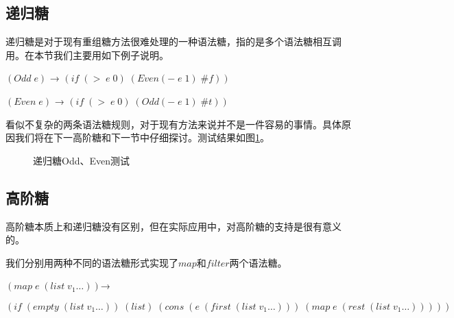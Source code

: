 \subsection{递归糖}

递归糖是对于现有重组糖方法很难处理的一种语法糖，指的是多个语法糖相互调用。在本节我们主要用如下例子说明。

$(Odd\;e)$ → $(if\;(>\;e\;0)\;(Even (-\;e\;1)\;\#f))$

$(Even\;e)$ → $(if\;(>\;e\;0)\;(Odd (-\;e\;1)\;\#t))$

看似不复杂的两条语法糖规则，对于现有方法来说并不是一件容易的事情。具体原因我们将在下一高阶糖和下一节中仔细探讨。测试结果如图\ref{fig:rec}。
\begin{figure}[ht]
	\begin{center}
	\end{center}
	\caption{递归糖Odd、Even测试}
\label{fig:rec}
\end{figure}


\subsection{高阶糖}

高阶糖本质上和递归糖没有区别，但在实际应用中，对高阶糖的支持是很有意义的。

我们分别用两种不同的语法糖形式实现了$map$和$filter$两个语法糖。
\begin{flushleft}
	$(map\;e\;(list\;v_1\ldots))$→
	
	$(if\;(empty\;(list\;v_1\ldots))\;(list)\;(cons\;(e\;(first\;(list\;v_1\ldots)))\;(map\;e\;(rest\;(list\;v_1\ldots)))))$
\end{flushleft}

